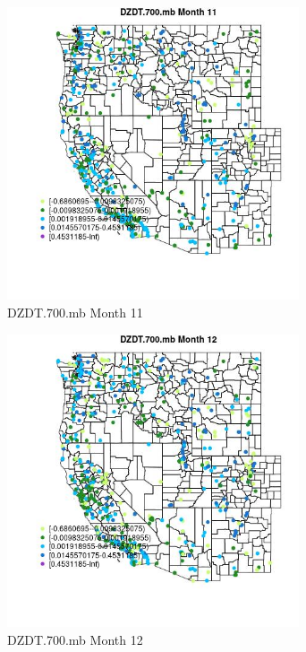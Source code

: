 \begin{figure} 
\centering  
\includegraphics[width=0.77\textwidth]{Code_Outputs/Report_ML_input_PM25_Step4_part_e_de_duplicated_aves_compiled_2019-05-14wNAs_MapObsMo11DZDT700mb.jpg} 
\caption{\label{fig:Report_ML_input_PM25_Step4_part_e_de_duplicated_aves_compiled_2019-05-14wNAsMapObsMo11DZDT700mb}DZDT.700.mb Month 11} 
\end{figure} 
 

\begin{figure} 
\centering  
\includegraphics[width=0.77\textwidth]{Code_Outputs/Report_ML_input_PM25_Step4_part_e_de_duplicated_aves_compiled_2019-05-14wNAs_MapObsMo12DZDT700mb.jpg} 
\caption{\label{fig:Report_ML_input_PM25_Step4_part_e_de_duplicated_aves_compiled_2019-05-14wNAsMapObsMo12DZDT700mb}DZDT.700.mb Month 12} 
\end{figure} 
 

